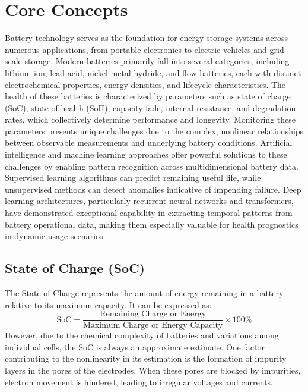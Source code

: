 \section{Core Concepts}
Battery technology serves as the foundation for energy storage systems across numerous applications, from portable electronics to electric vehicles and grid-scale storage. Modern batteries primarily fall into several categories, including lithium-ion, lead-acid, nickel-metal hydride, and flow batteries, each with distinct electrochemical properties, energy densities, and lifecycle characteristics. The health of these batteries is characterized by parameters such as state of charge (SoC), state of health (SoH), capacity fade, internal resistance, and degradation rates, which collectively determine performance and longevity. Monitoring these parameters presents unique challenges due to the complex, nonlinear relationships between observable measurements and underlying battery conditions. Artificial intelligence and machine learning approaches offer powerful solutions to these challenges by enabling pattern recognition across multidimensional battery data. Supervised learning algorithms can predict remaining useful life, while unsupervised methods can detect anomalies indicative of impending failure. Deep learning architectures, particularly recurrent neural networks and transformers, have demonstrated exceptional capability in extracting temporal patterns from battery operational data, making them especially valuable for health prognostics in dynamic usage scenarios.


\subsection{State of Charge (SoC)}
The State of Charge represents the amount of energy remaining in a battery relative to its maximum capacity. It can be expressed as:
\[
\text{SoC} = \frac{\text{Remaining Charge or Energy}}{\text{Maximum Charge or Energy Capacity}} \times 100\%
\]
However, due to the chemical complexity of batteries and variations among individual cells, the SoC is always an approximate estimate. One factor contributing to the nonlinearity in its estimation is the formation of impurity layers in the pores of the electrodes. When these pores are blocked by impurities, electron movement is hindered, leading to irregular voltages and currents.

